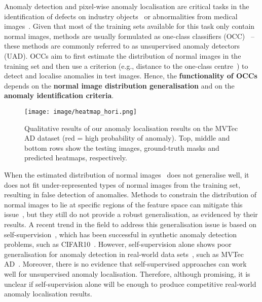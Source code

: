 \documentclass[final]{cvpr}
\begin{document}
Anomaly detection and pixel-wise anomaly localisation are critical tasks in the identification of defects on industry objects~\cite{mvtecad} or abnormalities from medical images~\cite{tian2020few,tian2021detecting,anogan,f-anogan}.
Given that most of the training sets available for this task only contain normal images, methods are usually formulated as one-class classifiers (OCC)~\cite{ratsch2000svm,hasan2016learning,zhang2016video,ravanbakhsh2017abnormal,ravanbakhsh2018plug,luo2017revisit,liu2018future, hinami2017joint,venkataramanan2019attention,dsvdd} -- these methods are commonly referred to as unsupervised anomaly detectors (UAD).
OCCs aim to first estimate the distribution of normal images in the training set and then use a criterion (e.g., distance to the one-class centre~\cite{dsvdd}) to detect and localise anomalies in test images.
Hence, the \textbf{functionality of OCCs} depends on the \textbf{normal image distribution generalisation} and on the \textbf{anomaly identification criteria}.

\begin{figure}[t]
    \centering
    \texttt{[image: image/heatmap\_hori.png]}
    \caption{
    Qualitative results of our anomaly localisation results on the MVTec AD dataset (red = high probability of anomaly). Top, middle and bottom rows show the testing images, ground-truth masks and predicted heatmaps, respectively.} 
    \label{fig:mvtec_seg}
\end{figure}



When the estimated distribution of normal images~\cite{ocgan,dsvdd,gong2019memorizing} does not generalise well, it does not fit  under-represented types of normal images from the training set, resulting in false detection of anomalies.
Methods to constrain the distribution of normal images to lie at specific regions of the feature space can mitigate this issue~\cite{ocgan,dsvdd}, but they still do not provide a robust generalisation, as evidenced by their results.
A recent trend in the field to address this generalisation issue is based on self-supervision~\cite{golan2018deep,bergman2020classification}, which has been successful in synthetic anomaly detection problems, such as CIFAR10~\cite{krizhevsky2014cifar}.
However, self-supervision alone shows poor generalisation for anomaly detection in real-world data sets~\cite{golan2018deep,bergman2020classification}, such as MVTec AD~\cite{mvtecad}.
Moreover, there is no evidence that self-supervised approaches can work well for unsupervised anomaly localisation.  Therefore, although promising, it is unclear if self-supervision alone will be enough to produce competitive  real-world anomaly localisation results. 
\end{document}
